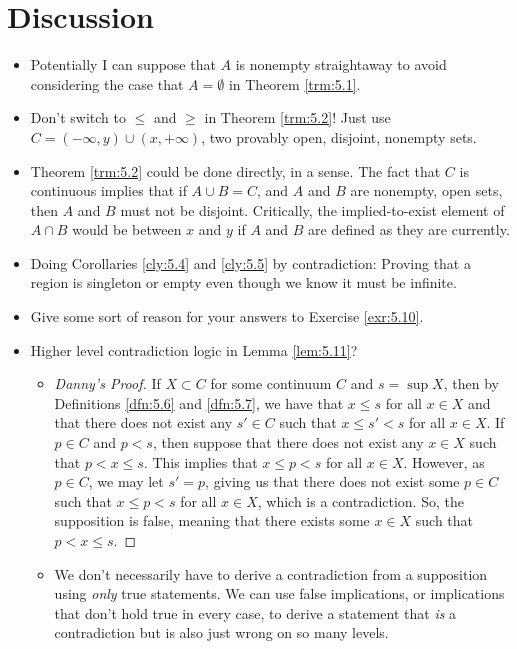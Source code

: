 \documentclass[titlepage]{report}
\begin{document}
\section{Discussion}
\begin{itemize}
    \item {}Potentially I can suppose that $A$ is nonempty straightaway to avoid considering the case that $A=\emptyset$ in Theorem \ref{trm:5.1}.
    \item Don't switch to $\leq$ and $\geq$ in Theorem \ref{trm:5.2}! Just use $C=(-\infty,y)\cup(x,+\infty)$, two provably open, disjoint, nonempty sets.
    \item Theorem \ref{trm:5.2} could be done directly, in a sense. The fact that $C$ is continuous implies that if $A\cup B=C$, and $A$ and $B$ are nonempty, open sets, then $A$ and $B$ must not be disjoint. Critically, the implied-to-exist element of $A\cap B$ would be between $x$ and $y$ if $A$ and $B$ are defined as they are currently.
    \item {}Doing Corollaries \ref{cly:5.4} and \ref{cly:5.5} by contradiction: Proving that a region is singleton or empty even though we know it must be infinite.
    \item Give some sort of reason for your answers to Exercise \ref{exr:5.10}.
    \item Higher level contradiction logic in Lemma \ref{lem:5.11}?
    \begin{itemize}
        \item 
        \begin{proof}[Danny's Proof]
            If $X\subset C$ for some continuum $C$ and $s=\sup X$, then by Definitions \ref{dfn:5.6} and \ref{dfn:5.7}, we have that $x\leq s$ for all $x\in X$ and that there does not exist any $s'\in C$ such that $x\leq s'<s$ for all $x\in X$. If $p\in C$ and $p<s$, then suppose that there does not exist any $x\in X$ such that $p<x\leq s$. This implies that $x\leq p<s$ for all $x\in X$. However, as $p\in C$, we may let $s'=p$, giving us that there does not exist some $p\in C$ such that $x\leq p<s$ for all $x\in X$, which is a contradiction. So, the supposition is false, meaning that there exists some $x\in X$ such that $p<x\leq s$.
        \end{proof}
        \item We don't necessarily have to derive a contradiction from a supposition using \emph{only} true statements. We can use false implications, or implications that don't hold true in every case, to derive a statement that \emph{is} a contradiction but is also just wrong on so many levels.

\end{itemize}
\end{itemize}
\end{document}

